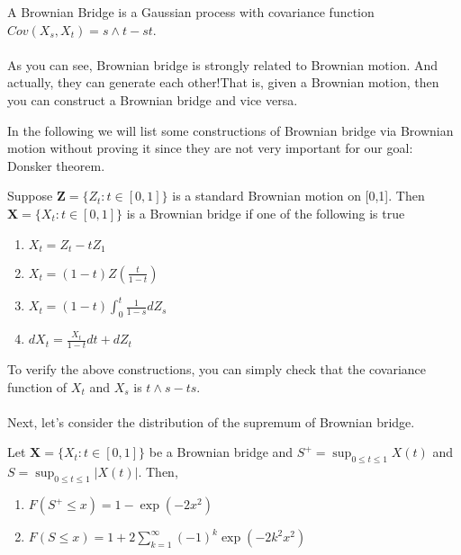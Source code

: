 \documentclass[final_project_1.tex]{subfiles}
\begin{document}
\begin{definition}
A Brownian Bridge is a Gaussian process with covariance function	$Cov(X_s,X_t)=s\wedge t-st$.
\end{definition}

\paragraph{}
As you can see, Brownian bridge is strongly related to Brownian motion. And actually, they can generate each other!That is, given a Brownian motion, then you can construct a Brownian bridge and vice versa.

In the following we will list some constructions of Brownian bridge via Brownian motion without proving it since they are not very important for our goal: Donsker theorem. 

\begin{property}
Suppose $\mathbf{Z} = \{Z_t: t\in[0,1]\}$ is a standard Brownian motion on [0,1]. Then $\mathbf{X} = \{X_t:t\in [0,1]\}$ is a Brownian bridge if one of the following is true
\begin{enumerate}
\item $X_t = Z_t-tZ_1$ \\
\item $X_t = (1-t)Z(\frac{t}{1-t})$ \\
\item $X_t = (1-t)\int^t_0 \frac{1}{1-s}dZ_s$ \\
\item $dX_t=\frac{X_t}{1-t}dt + dZ_t$
\end{enumerate}
\end{property}
To verify the above constructions, you can simply check that the covariance function of $X_t$ and $X_s$ is $t\wedge s - ts$.

\paragraph{}
Next, let's consider the distribution of the supremum of Brownian bridge.
\begin{property}
Let $\mathbf{X}=\{X_t:t\in[0,1]\}$ be a Brownian bridge and $S^+ = \sup_{0\leq t\leq 1}X(t)$ and $S = \sup_{0\leq t\leq 1}|X(t)|$. Then,
\begin{enumerate}
\item $F(S^+ \leq x) = 1-\exp(-2x^2)$\\
\item $F(S\leq x) = 1 + 2\sum^{\infty}_{k=1}(-1)^k\exp(-2k^2x^2)$
\end{enumerate}
\end{property}
\end{document}
